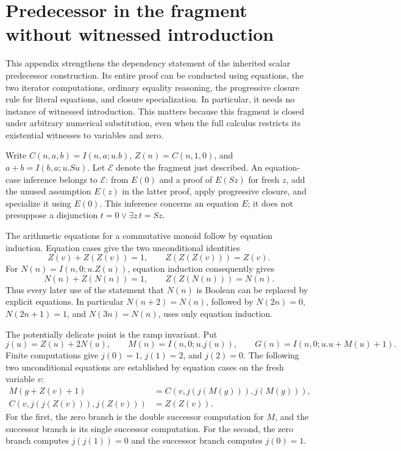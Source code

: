 \section{Predecessor in the fragment without witnessed introduction}
\label{sec:predecessor-fragment}

This appendix strengthens the dependency statement of the inherited scalar
predecessor construction.  Its entire proof can be conducted using equations,
the two iterator computations, ordinary equality reasoning, the progressive
closure rule for literal equations, and closure specialization.  In particular,
it needs no instance of witnessed introduction.  This matters because this
fragment is closed under arbitrary numerical substitution, even when the full
calculus restricts its existential witnesses to variables and zero.

Write $C(n,a,b)=I(n,a;u.b)$, $Z(n)=C(n,1,0)$, and
$a+b=I(b,a;u.Su)$.  Let $\mathcal E$ denote the fragment just described.
An equation-case inference belongs to $\mathcal E$: from $E(0)$ and a proof
of $E(Sz)$ for fresh $z$, add the unused assumption $E(z)$ in the latter
proof, apply progressive closure, and specialize it using $E(0)$.
This inference concerns an equation $E$; it does not presuppose a
disjunction $t=0\lor\exists z\,t=Sz$.

The arithmetic equations for a commutative monoid follow by equation
induction.  Equation cases give the two unconditional identities
\[
 Z(v)+Z(Z(v))=1,\qquad Z(Z(Z(v)))=Z(v).
\]
For $N(n)=I(n,0;u.Z(u))$, equation induction consequently gives
\[
 N(n)+Z(N(n))=1,\qquad Z(Z(N(n)))=N(n).
\]
Thus every later use of the statement that $N(n)$ is Boolean can be
replaced by explicit equations.  In particular $N(n+2)=N(n)$, followed
by $N(2n)=0$, $N(2n+1)=1$, and $N(3n)=N(n)$, uses only equation induction.

The potentially delicate point is the ramp invariant.  Put
\[
 j(u)=Z(u)+2N(u),\qquad M(n)=I(n,0;u.j(u)),\qquad
 G(n)=I(n,0;u.u+M(u)+1).
\]
Finite computations give $j(0)=1$, $j(1)=2$, and $j(2)=0$.
The following two unconditional equations are established by equation
cases on the fresh variable $v$:
\begin{align*}
 M(g+Z(v)+1)&=C(v,j(j(M(g))),j(M(g))),\\
 C(v,j(j(Z(v))),j(Z(v)))&=Z(Z(v)).
\end{align*}
For the first, the zero branch is the double successor computation for
$M$, and the successor branch is its single successor computation.
For the second, the zero branch computes $j(j(1))=0$ and the successor
branch computes $j(0)=1$.

